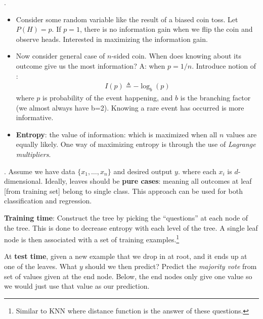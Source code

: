 \documentclass[12pt]{article}
\newcommand{\myspace}{\vspace{2\bigskipamount}}
\newcommand\p{\Needspace{10\baselineskip} \noindent}
\begin{document}
\myspace
\p {}. 
\begin{itemize}
	\item Consider some random variable like the result of a biased coin toss. Let $P(H) = p$. If $p = 1$, there is no information gain when we flip the coin and observe heads. Interested in maximizing the information gain. 
	
	\item Now consider general case of $n$-sided coin. When does knowing about its outcome give us the most information? A: when $p = 1/n$. Introduce notion of :
	\begin{align}
	I(p) \triangleq -\log_b(p)
	\end{align}
	where $p$ is probability of the event happening, and $b$ is the branching factor (we almost always have b=2). Knowing a rare event has occurred is more informative.
	
	\item \textbf{Entropy}: the  value of information:
	which is maximized when all $n$ values are equally likely. One way of maximizing entropy is through the use of \textit{Lagrange multipliers}. 
\end{itemize}

\myspace
\p {}. Assume we have data $\{x_1, \ldots, x_n\}$ and desired output $y$. where each $x_i$ is $d$-dimensional. Ideally, leaves should be \textbf{pure cases}: meaning all outcomes at leaf [from training set] belong to single class. This approach can be used for both classification and regression.
\begin{compactitem}
	
	\item \textbf{Training time}: Construct the tree by picking the ``questions'' at each node of the tree. This is done to decrease entropy with each level of the tree. A single leaf node is then associated with a set of training examples.\footnote{Similar to KNN where distance function is the answer of these questions.}
	
	\item At \textbf{test time}, given a new example that we drop in at root, and it ends up at one of the leaves. What $y$ should we then predict? Predict the \textit{majority vote} from set of values given at the end node. Below, the end nodes only give one value so we would just use that value as our prediction.
\end{compactitem}
 
\end{document}
